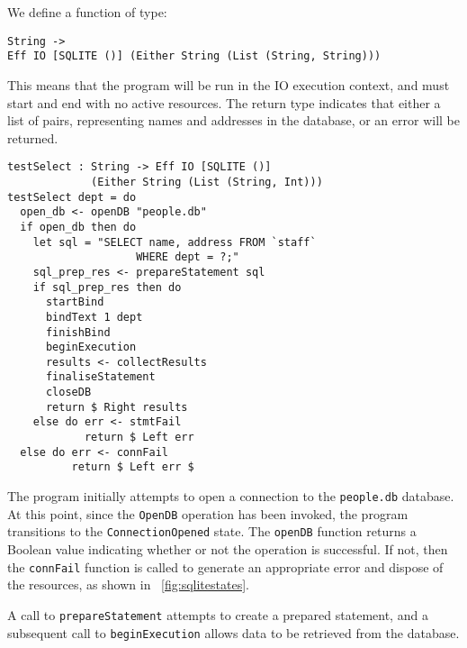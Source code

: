 \documentclass[preprint]{sigplanconf}
\begin{document}
We define a function of type:
\begin{Verbatim}
String ->
Eff IO [SQLITE ()] (Either String (List (String, String)))
\end{Verbatim}
This means that the program will be run in the IO execution context, and must start and end with no active resources. The return type indicates that either a list of  pairs, representing names and addresses in the database, or an error will be returned. 
\begin{Verbatim}
testSelect : String -> Eff IO [SQLITE ()] 
             (Either String (List (String, Int)))
testSelect dept = do
  open_db <- openDB "people.db"
  if open_db then do
    let sql = "SELECT name, address FROM `staff` 
                    WHERE dept = ?;"
    sql_prep_res <- prepareStatement sql
    if sql_prep_res then do 
      startBind
      bindText 1 dept
      finishBind
      beginExecution
      results <- collectResults
      finaliseStatement
      closeDB
      return $ Right results
    else do err <- stmtFail
            return $ Left err
  else do err <- connFail
          return $ Left err $
\end{Verbatim}
The program initially attempts to open a connection to the \texttt{people.db} database. At this point, since the \texttt{OpenDB} operation has been invoked, the program transitions to the \texttt{ConnectionOpened} state. The \texttt{openDB} function returns a Boolean value indicating whether or not the operation is successful. If not, then the \texttt{connFail} function is called to generate an appropriate error and dispose of the resources, as shown in ~\ref{fig:sqlitestates}.

A call to \texttt{prepareStatement} attempts to create a prepared statement, and a subsequent call to \texttt{beginExecution} allows data to be retrieved from the database.
\end{document}
